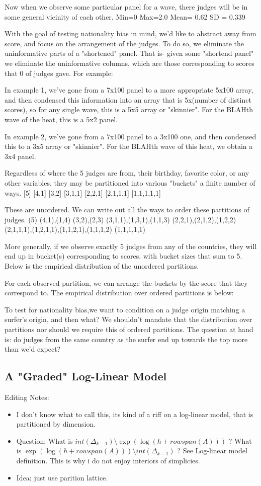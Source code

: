 \documentclass{article}
\begin{document}
Now when we observe some particular panel for a wave, there judges will be in some general vicinity of each other.
Min=0
Max=2.0
Mean= 0.62
SD = 0.339

With the goal of testing nationality bias in mind, we'd like to abstract away from score, and focus on the arrangement of the judges. To do so, we eliminate the uninformative parts of a "shortened" panel. That is- given some "shortend panel" we eliminate the uninformative columns, which are those corresponding to scores that 0 of judges gave. For example:

In example 1, we've gone from a 7x100 panel to a more appropriate 5x100 array, and then condensed this information into an array that is 5x(number of distinct scores), so for any single wave, this is a 5x5 array or "skinnier". For the BLAHth wave of the heat, this is a 5x2 panel.

In example 2, we've gone from a 7x100 panel to a 3x100 one, and then condensed this to a 3x5 array or "skinnier". For the BLAHth wave of this heat, we obtain a 3x4 panel.

Regardless of where the 5 judges are from, their birthday, favorite color, or any other variables, they may be partitioned into various "buckets" a finite number of ways.
[5]
[4,1]
[3,2]
[3,1,1]
[2,2,1]
[2,1,1,1]
[1,1,1,1,1]

These are unordered. We can write out all the ways to order these partitions of judges.
(5)
(4,1),(1,4)
(3,2),(2,3)
(3,1,1),(1,3,1),(1,1,3)
(2,2,1),(2,1,2),(1,2,2)
(2,1,1,1),(1,2,1,1),(1,1,2,1),(1,1,1,2)
(1,1,1,1,1)

More generally, if we observe exactly 5 judges from any of the countries, they will end up in bucket(s) corresponding to scores, with bucket sizes that sum to 5. Below is the empirical distribution of the unordered partitions.

For each observed partition, we can arrange the buckets by the score that they correspond to. The empirical distribution over ordered partitions is below:


To test for nationality bias,we want to condition on a judge origin matching a surfer's origin, and then what? We shouldn't mandate that the distribution over partitions nor should we require this of ordered partitions. The question at hand is: do judges from the same country as the surfer end up towards the top more than we'd expect?
\subsection{A "Graded" Log-Linear Model}
Editing Notes:
\begin{itemize}
\item I don't know what to call this, its kind of a riff on a log-linear model, that is partitioned by dimension.
\item Question: What is $int(\Delta_{k-1}) \setminus \exp(\log(h+rowspan(A)))$ ? What is $\exp(\log(h+rowspan(A))) \setminus int(\Delta_{k-1})$ ? See Log-linear model definition. This is why i do not enjoy interiors of simplicies.
\item Idea: just use parition lattice.
\end{itemize}
\end{document}
